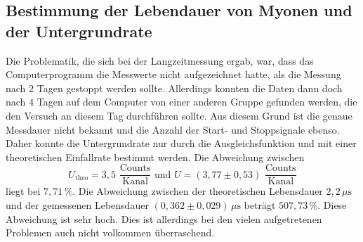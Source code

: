 \subsection{Bestimmung der Lebendauer von Myonen und der Untergrundrate}
Die Problematik, die sich bei der Langzeitmessung ergab, war, dass das Computerprogramm die Messwerte nicht aufgezeichnet hatte, als
die Messung nach $2$ Tagen gestoppt werden sollte. Allerdings konnten die Daten dann doch nach $4$ Tagen auf dem Computer von einer 
anderen Gruppe gefunden werden, die den Versuch an diesem Tag durchführen sollte. Aus diesem Grund ist die genaue Messdauer nicht
bekannt und die Anzahl der Start- und Stoppsignale ebenso. Daher konnte die Untergrundrate nur durch die Ausgleichsfunktion und 
mit einer theoretischen Einfallrate bestimmt werden. Die Abweichung zwischen 
$$U_{\text{theo}} = 3,5 \,\, \frac{\text{Counts}}{\text{Kanal}}\,\, \text{und} \,\, U = (3,77 \pm 0,53) \,\, \frac{\text{Counts}}{\text{Kanal}}$$
liegt bei $7,71 \, \%$. Die Abweichung zwischen der theoretischen Lebensdauer $2,2 \, \unit{\mu\second}$ und der gemessenen Lebensdauer 
$(0,362 \pm 0,029)\, \unit{\mu\second}$ beträgt $507,73 \, \%$. Diese Abweichung ist sehr hoch. Dies ist allerdings bei den vielen aufgetretenen 
Problemen auch nicht volkommen überraschend.  


